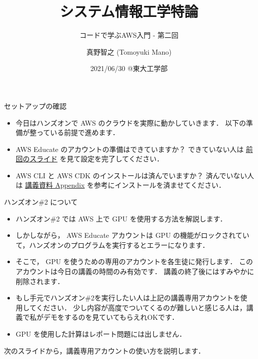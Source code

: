 \documentclass[unicode,11pt]{beamer}
\title{システム情報工学特論}
\subtitle{コードで学ぶAWS入門 - 第二回}
\author{真野智之 (Tomoyuki Mano)}
\institute[OIST]{Okinawa Institute of Science and Technology}
\date{2021/06/30 @東大工学部}
\begin{document}
\frame{\titlepage}

\begin{frame}{セットアップの確認}

\begin{itemize}
    \item 今日はハンズオンで AWS のクラウドを実際に動かしていきます．
    以下の準備が整っている前提で進めます．
    \item AWS Educate のアカウントの準備はできていますか？
できていない人は \href{https://github.com/tomomano/intro-aws-2021/blob/main/slides/20210623.pdf}{前回のスライド} を見て設定を完了してください．
    \item AWS CLI と AWS CDK のインストールは済んでいますか？
済んでいない人は \href{https://tomomano.github.io/learn-aws-by-coding/#_appendix}{講義資料 Appendix} を参考にインストールを済ませてください．
\end{itemize}

\end{frame}

\begin{frame}{ハンズオン\#2 について}

\begin{itemize}
    \item ハンズオン\#2 では AWS 上で GPU を使用する方法を解説します．
    \item しかしながら， AWS Educate アカウントは GPU の機能がロックされていて，ハンズオンのプログラムを実行するとエラーになります．
    \item {\color{red} そこで， GPU を使うための専用のアカウントを各生徒に発行します．
    このアカウントは今日の講義の時間のみ有効です．}
    講義の終了後にはすみやかに削除されます．
    \item もし手元でハンズオン\#2を実行したい人は上記の講義専用アカウントを使用してください．
    少し内容が高度でついてくるのが難しいと感じる人は，講義で私がデモをするのを見ていてもらえれOKです．
    \item GPU を使用した計算はレポート問題には出しません．
\end{itemize}

次のスライドから，講義専用アカウントの使い方を説明します．

\end{frame}
\end{document}
